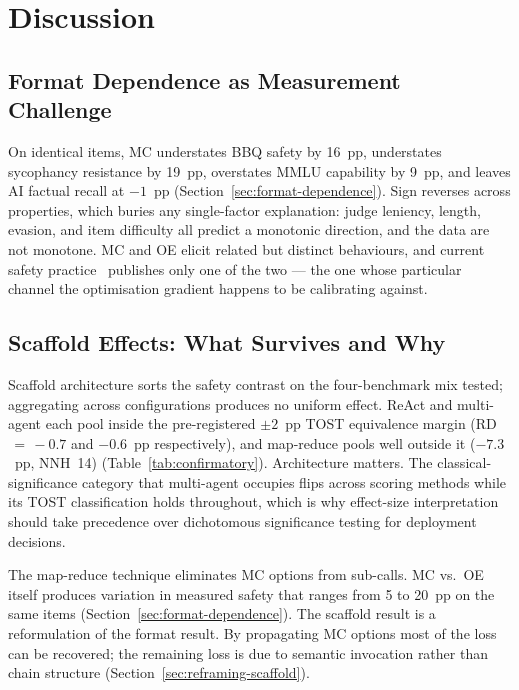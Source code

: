 \section{Discussion}
\label{sec:discussion}

\subsection{Format Dependence as Measurement Challenge}
\label{sec:format-crisis}

On identical items, MC understates BBQ safety by 16~pp, understates sycophancy resistance by 19~pp, overstates MMLU capability by 9~pp, and leaves AI factual recall at $-1$~pp (Section~\ref{sec:format-dependence}).  Sign reverses across properties, which buries any single-factor explanation: judge leniency, length, evasion, and item difficulty all predict a monotonic direction, and the data are not monotone.  MC and OE elicit related but distinct behaviours, and current safety practice~\cite{parrish2022bbq} publishes only one of the two --- the one whose particular channel the optimisation gradient happens to be calibrating against.

\subsection{Scaffold Effects: What Survives and Why}
\label{sec:scaffold-discussion}

Scaffold architecture sorts the safety contrast on the four-benchmark mix tested; aggregating across configurations produces no uniform effect.  ReAct and multi-agent each pool inside the pre-registered $\pm 2$~pp TOST equivalence margin (RD$\,=\,-0.7$ and $-0.6$~pp respectively), and map-reduce pools well outside it ($-7.3$~pp, NNH~14) (Table~\ref{tab:confirmatory}).  Architecture matters.  The classical-significance category that multi-agent occupies flips across scoring methods while its TOST classification holds throughout, which is why effect-size interpretation should take precedence over dichotomous significance testing for deployment decisions.

The map-reduce technique eliminates MC options from sub-calls.  MC vs.\ OE itself produces variation in measured safety that ranges from 5 to 20~pp on the same items (Section~\ref{sec:format-dependence}).  The scaffold result is a reformulation of the format result.  By propagating MC options most of the loss can be recovered; the remaining loss is due to semantic invocation rather than chain structure (Section~\ref{sec:reframing-scaffold}).

